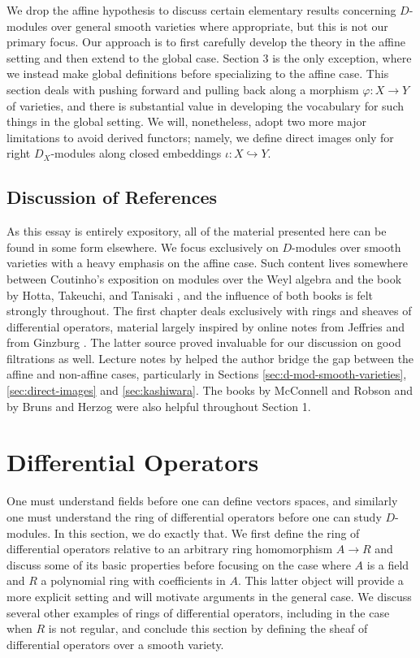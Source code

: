 We drop the affine hypothesis to discuss certain elementary results concerning $D$-modules over general smooth varieties where appropriate, but this is not our primary focus. Our approach is to first carefully develop the theory in the affine setting and then extend to the global case. Section 3 is the only exception, where we instead make global definitions before specializing to the affine case. This section deals with pushing forward and pulling back along a morphism $\varphi:X\to Y$ of varieties, and there is substantial value in developing the vocabulary for such things in the global setting. We will, nonetheless, adopt two more major limitations to avoid derived functors; namely, we define direct images only for right $D_X$-modules along closed embeddings $\iota:X\hookrightarrow Y$.

\bigskip

\subsection*{Discussion of References}
\noindent As this essay is entirely expository, all of the material presented here can be found in some form elsewhere. We focus exclusively on $D$-modules over smooth varieties with a heavy emphasis on the affine case. Such content lives somewhere between Coutinho's exposition on modules over the Weyl algebra \cite{d-mod-primer} and the book by Hotta, Takeuchi, and Tanisaki \cite{d-mod_ps-rt}, and the influence of both books is felt strongly throughout. The first chapter deals exclusively with rings and sheaves of differential operators, material largely inspired by online notes from Jeffries \cite{jeffries_d-mod} and from Ginzburg \cite{ginzburg_d-mod}. The latter source proved invaluable for our discussion on good filtrations as well. Lecture notes by \cite{cschnell} helped the author bridge the gap between the affine and non-affine cases, particularly in Sections \ref{sec:d-mod-smooth-varieties}, \ref{sec:direct-images} and \ref{sec:kashiwara}. The books \cite{mcconnell-robson} by McConnell and Robson and \cite{bruns-herzog} by Bruns and Herzog were also helpful throughout Section 1.

\newpage
\section{Differential Operators}
One must understand fields before one can define vectors spaces, and similarly one must understand the ring of differential operators before one can study $D$-modules. In this section, we do exactly that. We first define the ring of differential operators relative to an arbitrary ring homomorphism $A\to R$ and discuss some of its basic properties before focusing on the case where $A$ is a field and $R$ a polynomial ring with coefficients in $A$. This latter object will provide a more explicit setting and will motivate arguments in the general case. We discuss several other examples of rings of differential operators, including in the case when $R$ is not regular, and conclude this section by defining the sheaf of differential operators over a smooth variety.

